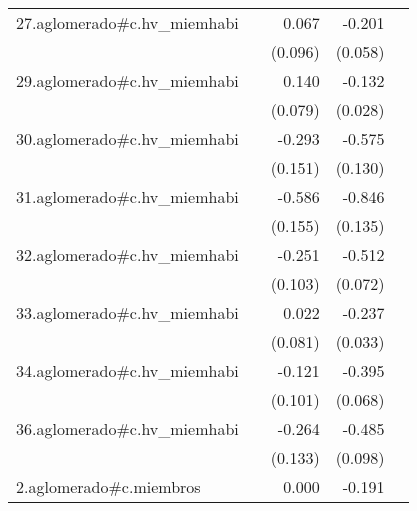 {\begin{longtable}{l*{4}{D{.}{.}{-1}}}
\addlinespace
27.aglomerado#c.hv\_miemhabi&                     &       0.067         &      -0.201\sym{***}&                     \\
            &                     &     (0.096)         &     (0.058)         &                     \\
\addlinespace
29.aglomerado#c.hv\_miemhabi&                     &       0.140         &      -0.132\sym{***}&                     \\
            &                     &     (0.079)         &     (0.028)         &                     \\
\addlinespace
30.aglomerado#c.hv\_miemhabi&                     &      -0.293         &      -0.575\sym{***}&                     \\
            &                     &     (0.151)         &     (0.130)         &                     \\
\addlinespace
31.aglomerado#c.hv\_miemhabi&                     &      -0.586\sym{***}&      -0.846\sym{***}&                     \\
            &                     &     (0.155)         &     (0.135)         &                     \\
\addlinespace
32.aglomerado#c.hv\_miemhabi&                     &      -0.251\sym{*}  &      -0.512\sym{***}&                     \\
            &                     &     (0.103)         &     (0.072)         &                     \\
\addlinespace
33.aglomerado#c.hv\_miemhabi&                     &       0.022         &      -0.237\sym{***}&                     \\
            &                     &     (0.081)         &     (0.033)         &                     \\
\addlinespace
34.aglomerado#c.hv\_miemhabi&                     &      -0.121         &      -0.395\sym{***}&                     \\
            &                     &     (0.101)         &     (0.068)         &                     \\
\addlinespace
36.aglomerado#c.hv\_miemhabi&                     &      -0.264\sym{*}  &      -0.485\sym{***}&                     \\
            &                     &     (0.133)         &     (0.098)         &                     \\
\addlinespace
2.aglomerado#c.miembros&                     &       0.000         &      -0.191\sym{***}&                     \\

\end{longtable}}
